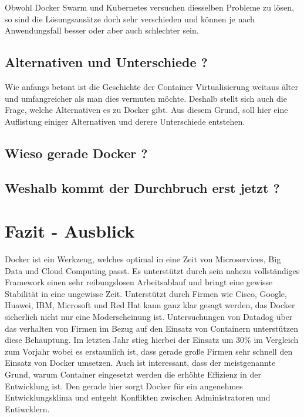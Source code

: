 \documentclass[12pt,toc=bib,toc=listof]{scrreprt}
\begin{document}
Obwohl Docker Swarm und Kubernetes versuchen diesselben Probleme zu lösen, so sind die Lösungsansätze doch sehr verschieden und können je nach Anwendungsfall besser oder aber auch schlechter sein.

\section{Alternativen und Unterschiede ?}
Wie anfangs betont ist die Geschichte der Container Virtualisierung weitaus älter und umfangreicher als man dies vermuten möchte.
Deshalb stellt sich auch die Frage, welche Alternativen es zu Docker gibt.
Aus diesem Grund, soll hier eine Auflistung einiger Alternativen und derere Unterschiede entstehen.






\section{Wieso gerade Docker ?}

\section{Weshalb kommt der Durchbruch erst jetzt ?}

\chapter{Fazit - Ausblick} %
\label{sec:fazit}

Docker ist ein Werkzeug, welches optimal in eine Zeit von Microservices, Big Data und Cloud Computing passt.
Es unterstützt durch sein nahezu vollständiges Framework einen sehr reibungslosen Arbeitsablauf und bringt eine gewisse Stabilität in eine ungewisse Zeit.
Unterstützt durch Firmen wie Cisco, Google, Huawei, IBM, Microsoft und Red Hat kann ganz klar gesagt werden, das Docker sicherlich nicht nur eine Moderscheinung ist.
Untersuchungen von Datadog über das verhalten von Firmen im Bezug auf den Einsatz von Containern unterstützen diese Behauptung.
Im letzten Jahr stieg hierbei der Einsatz um 30\% im Vergleich zum Vorjahr wobei es erstaunlich ist, dass gerade große Firmen sehr schnell den Einsatz von Docker umsetzen.
Auch ist interessant, dass der meistgenannte Grund, warum Container eingesetzt werden die erhöhte Effizienz in der Entwicklung ist.
Den gerade hier sorgt Docker für ein angenehmes Entwicklungsklima und entgeht Konflikten zwischen Administratoren und Entiwcklern.
\end{document}
